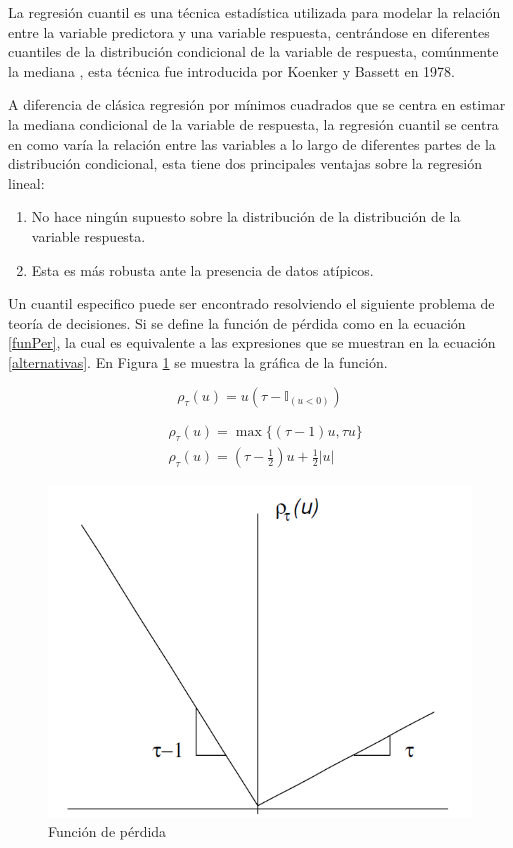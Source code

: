     La regresión cuantil es una técnica estadística utilizada para modelar la relación entre la variable predictora y una variable respuesta, centrándose en diferentes cuantiles de la distribución condicional de la variable de respuesta, comúnmente la mediana \cite{cuantilReg}, esta técnica fue introducida por Koenker y Bassett en 1978.  
    
    A diferencia de clásica regresión por mínimos cuadrados que se centra en estimar la mediana condicional de la variable de respuesta, la regresión cuantil se centra en como varía la relación entre las variables a lo largo de diferentes partes de la distribución condicional, esta tiene dos principales ventajas sobre la regresión lineal:
    
    \begin{enumerate}
        \item No hace ningún supuesto sobre la distribución de la distribución de la variable respuesta.
        \item Esta es más robusta ante la presencia de datos atípicos. 
    \end{enumerate}

    Un cuantil especifico puede ser encontrado resolviendo el siguiente problema de teoría de decisiones. Si se define la función de pérdida como en la ecuación \eqref{funPer}, la cual es equivalente a las expresiones que se muestran en la ecuación \eqref{alternativas}. En Figura \ref{fig:perdida} se muestra la gráfica de la función.
    
    \begin{equation}\label{funPer}
    \rho_\tau(u)= u\left(\tau-\mathbb{I}_{(u<0)}\right)
    \end{equation}

    \begin{equation}\label{alternativas}
    \begin{split}
        &\rho_\tau(u)=\max \{(\tau-1) u, \tau u\}\\
        &\rho_\tau(u)=\left(\tau-\frac{1}{2}\right) u+\frac{1}{2}|u|
    \end{split}
    \end{equation}
    
    \begin{figure}[H]
        \centering
        \includegraphics[width = 0.5 \textwidth]{Imagenes/perdida.png}
        \caption{Función de pérdida}
        \label{fig:perdida}
    \end{figure}
    
